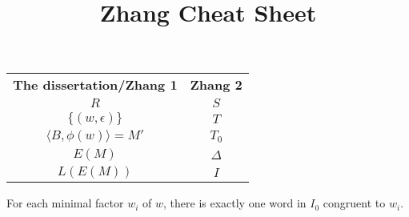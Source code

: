 \documentclass{lmaths}
\title{Zhang Cheat Sheet}
\author{}
\begin{document}
\maketitle

\centering
\begin{tabular}{cc}
	\textbf{The dissertation/Zhang 1} & \textbf{Zhang 2} \\
	$R$ & $S$ \\
	$\{(w, \epsilon)\}$ & $T$ \\
	$\langle B, \phi(w) \rangle = M'$ & $T_0$ \\
	$E(M)$ & $\Delta$ \\
	$L(E(M))$ & $I$
\end{tabular}

\setcounter{section}{4}
\setcounter{defn}{1}
\begin{lemma}
	For each minimal factor $w_i$ of $w$, there is exactly one word in $I_0$ congruent to $w_i$.
\end{lemma}
\end{document}
